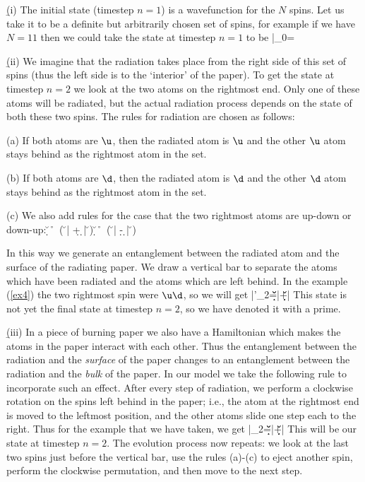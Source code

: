\documentclass[11pt]{article}
\begin{document}
\b

(i) The initial state (timestep $n=1$) is a wavefunction for the $N$ spins. Let us take it to be a definite but arbitrarily chosen set of spins, for example if we have $N=11$ then we could take the state at timestep $n=1$ to be
\be
|\Psi\rangle_0=\d\u\d\u\u\d\d\u\d\u\d
\label{ex4}
\ee


\b

(ii) We imagine that the radiation takes place from the right side of this set of spins (thus the left side is to the `interior' of the paper). To get the state at timestep $n=2$ we look at the two atoms on the rightmost end. Only one of these atoms will be radiated, but the actual radiation process depends on the state of both these two spins. The rules for radiation are chosen as follows:


(a) If both atoms are $\u$, then the radiated atom is $\u$ and the other $\u$ atom stays behind as the rightmost atom in the set.

(b) If both atoms are $\d$, then the radiated atom is $\d$ and the other $\d$ atom stays behind as the rightmost atom in the set.

(c) We also add rules for the case that the two rightmost atoms are up-down or down-up:
\be
\u\d~\r~\sqi \Big ( \u \Big | \d + \d \Big | \u\Big )
\ee
\be
\d\u~\r~\sqi \Big ( \u \Big | \d - \d \Big | \u\Big )
\ee


In this way we generate an entanglement between the radiated atom and the surface of the radiating paper. We draw a vertical bar to separate the atoms which have been radiated and the atoms which are left behind. In the example (\ref{ex4}) the two rightmost spin were $\u\d$, so we will get 
\be
|\Psi'\rangle_2=\sq \d\u\d\u\u\d\d\u\d\u\Big |\d+\sq \d\u\d\u\u\d\d\u\d\d\Big |\u
\label{ex4p}
\ee
This state is not yet the final state at timestep $n=2$, so we have denoted it with a prime.

\b

(iii) In a piece of burning paper we also have a Hamiltonian which makes the atoms in the paper interact with each other.  Thus the entanglement between the radiation and the {\it surface} of the paper changes  to an entanglement between the radiation and the {\it bulk} of the paper. In our model we take the following rule to incorporate such an effect. After every step of radiation, we perform a clockwise rotation on the spins left behind in the paper; i.e., the atom at the rightmost end is moved to the leftmost position, and the other atoms slide one step each to the right. Thus for the example that we have taken, we get
\be
|\Psi\rangle_2=\sq \u\d\u\d\u\u\d\d\u\d\Big |\d+\sq \d\d\u\d\u\u\d\d\u\d\Big |\u
\label{ex4pp}
\ee
This will be our state at timestep $n=2$. The evolution process now repeats: we look  at the last two spins just before the vertical bar, use the rules (a)-(c) to eject another spin, perform the clockwise permutation, and then move to the next step.
\end{document}
